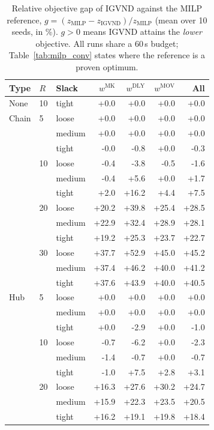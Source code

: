 \begin{table}[htbp]
  \centering
  \caption{Relative objective gap of IGVND against the MILP reference, $g = (z_{\mathrm{MILP}} - z_{\mathrm{IGVND}})/z_{\mathrm{MILP}}$ (mean over 10 seeds, in \%). $g>0$ means IGVND attains the \emph{lower} objective. All runs share a 60\,s budget; Table~\ref{tab:milp_conv} states where the reference is a proven optimum.}
  \label{tab:gap_profile}
  \begin{tabular}{lll rrr r}
    \toprule
    Type & $R$ & Slack & $w^{\mathrm{MK}}$ & $w^{\mathrm{DLY}}$ & $w^{\mathrm{MOV}}$ & All \\
    \midrule
    None & 10 & tight & +0.0 & +0.0 & +0.0 & +0.0 \\
    Chain & 5 & loose & +0.0 & +0.0 & +0.0 & +0.0 \\
     &  & medium & +0.0 & +0.0 & +0.0 & +0.0 \\
     &  & tight & -0.0 & -0.8 & +0.0 & -0.3 \\
     & 10 & loose & -0.4 & -3.8 & -0.5 & -1.6 \\
     &  & medium & -0.4 & +5.6 & +0.0 & +1.7 \\
     &  & tight & +2.0 & +16.2 & +4.4 & +7.5 \\
     & 20 & loose & +20.2 & +39.8 & +25.4 & +28.5 \\
     &  & medium & +22.9 & +32.4 & +28.9 & +28.1 \\
     &  & tight & +19.2 & +25.3 & +23.7 & +22.7 \\
     & 30 & loose & +37.7 & +52.9 & +45.0 & +45.2 \\
     &  & medium & +37.4 & +46.2 & +40.0 & +41.2 \\
     &  & tight & +37.6 & +43.9 & +40.0 & +40.5 \\
    Hub & 5 & loose & +0.0 & +0.0 & +0.0 & +0.0 \\
     &  & medium & +0.0 & +0.0 & +0.0 & +0.0 \\
     &  & tight & +0.0 & -2.9 & +0.0 & -1.0 \\
     & 10 & loose & -0.7 & -6.2 & +0.0 & -2.3 \\
     &  & medium & -1.4 & -0.7 & +0.0 & -0.7 \\
     &  & tight & -1.0 & +7.5 & +2.8 & +3.1 \\
     & 20 & loose & +16.3 & +27.6 & +30.2 & +24.7 \\
     &  & medium & +15.9 & +22.3 & +23.5 & +20.5 \\
     &  & tight & +16.2 & +19.1 & +19.8 & +18.4 \\

\end{tabular}
\end{table}
